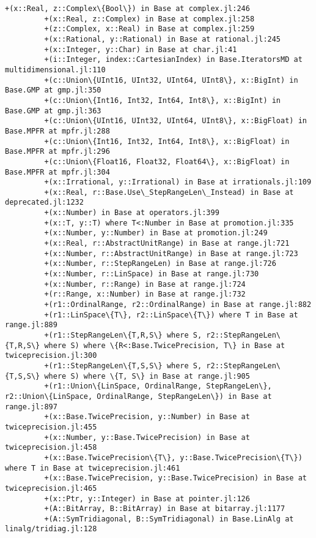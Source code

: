 \documentclass[11pt]{article}
\begin{document}
\begin{Verbatim}[commandchars=\\\{\}]
         +(x::Real, z::Complex\{Bool\}) in Base at complex.jl:246
         +(x::Real, z::Complex) in Base at complex.jl:258
         +(z::Complex, x::Real) in Base at complex.jl:259
         +(x::Rational, y::Rational) in Base at rational.jl:245
         +(x::Integer, y::Char) in Base at char.jl:41
         +(i::Integer, index::CartesianIndex) in Base.IteratorsMD at multidimensional.jl:110
         +(c::Union\{UInt16, UInt32, UInt64, UInt8\}, x::BigInt) in Base.GMP at gmp.jl:350
         +(c::Union\{Int16, Int32, Int64, Int8\}, x::BigInt) in Base.GMP at gmp.jl:363
         +(c::Union\{UInt16, UInt32, UInt64, UInt8\}, x::BigFloat) in Base.MPFR at mpfr.jl:288
         +(c::Union\{Int16, Int32, Int64, Int8\}, x::BigFloat) in Base.MPFR at mpfr.jl:296
         +(c::Union\{Float16, Float32, Float64\}, x::BigFloat) in Base.MPFR at mpfr.jl:304
         +(x::Irrational, y::Irrational) in Base at irrationals.jl:109
         +(x::Real, r::Base.Use\_StepRangeLen\_Instead) in Base at deprecated.jl:1232
         +(x::Number) in Base at operators.jl:399
         +(x::T, y::T) where T<:Number in Base at promotion.jl:335
         +(x::Number, y::Number) in Base at promotion.jl:249
         +(x::Real, r::AbstractUnitRange) in Base at range.jl:721
         +(x::Number, r::AbstractUnitRange) in Base at range.jl:723
         +(x::Number, r::StepRangeLen) in Base at range.jl:726
         +(x::Number, r::LinSpace) in Base at range.jl:730
         +(x::Number, r::Range) in Base at range.jl:724
         +(r::Range, x::Number) in Base at range.jl:732
         +(r1::OrdinalRange, r2::OrdinalRange) in Base at range.jl:882
         +(r1::LinSpace\{T\}, r2::LinSpace\{T\}) where T in Base at range.jl:889
         +(r1::StepRangeLen\{T,R,S\} where S, r2::StepRangeLen\{T,R,S\} where S) where \{R<:Base.TwicePrecision, T\} in Base at twiceprecision.jl:300
         +(r1::StepRangeLen\{T,S,S\} where S, r2::StepRangeLen\{T,S,S\} where S) where \{T, S\} in Base at range.jl:905
         +(r1::Union\{LinSpace, OrdinalRange, StepRangeLen\}, r2::Union\{LinSpace, OrdinalRange, StepRangeLen\}) in Base at range.jl:897
         +(x::Base.TwicePrecision, y::Number) in Base at twiceprecision.jl:455
         +(x::Number, y::Base.TwicePrecision) in Base at twiceprecision.jl:458
         +(x::Base.TwicePrecision\{T\}, y::Base.TwicePrecision\{T\}) where T in Base at twiceprecision.jl:461
         +(x::Base.TwicePrecision, y::Base.TwicePrecision) in Base at twiceprecision.jl:465
         +(x::Ptr, y::Integer) in Base at pointer.jl:126
         +(A::BitArray, B::BitArray) in Base at bitarray.jl:1177
         +(A::SymTridiagonal, B::SymTridiagonal) in Base.LinAlg at linalg/tridiag.jl:128

\end{Verbatim}
\end{document}
